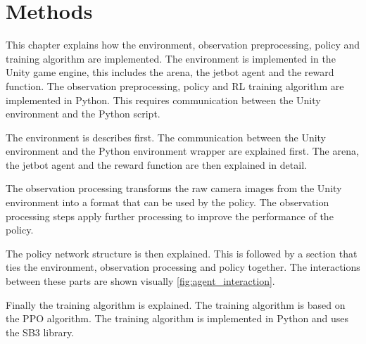 \chapter{Methods}
\label{cha:Methods}

This chapter explains how the environment, observation preprocessing, policy and training algorithm are implemented. The environment is implemented in the Unity game engine, this includes the arena, the jetbot agent and the reward function. The observation preprocessing, policy and \acs{RL} training algorithm are implemented in Python. This requires communication between the Unity environment and the Python script.

The environment is describes first. The communication between the Unity environment and the Python environment wrapper are explained first. The arena, the jetbot agent and the reward function are then explained in detail.

The observation processing transforms the raw camera images from the Unity environment into a format that can be used by the policy. The observation processing steps apply further processing to improve the performance of the policy.

The policy network structure is then explained. This is followed by a section that ties the environment, observation processing and policy together. The  interactions between these parts are shown visually \ref{fig:agent_interaction}.

Finally the training algorithm is explained. The training algorithm is based on the \acs{PPO} algorithm. The training algorithm is implemented in Python and uses the \acs{SB3} library.


